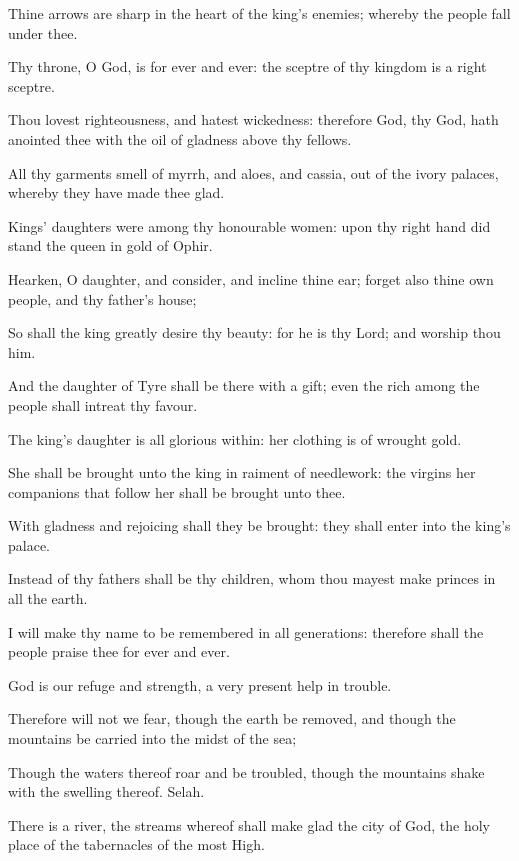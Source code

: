 \Verse Thine arrows are sharp in the heart of the king's enemies; whereby the people fall under thee.

\Verse Thy throne, O God, is for ever and ever: the sceptre of thy kingdom is a right sceptre.

\Verse Thou lovest righteousness, and hatest wickedness: therefore God, thy God, hath anointed thee with the oil of gladness above thy fellows.

\Verse All thy garments smell of myrrh, and aloes, and cassia, out of the ivory palaces, whereby they have made thee glad.

\Verse Kings' daughters were among thy honourable women: upon thy right hand did stand the queen in gold of Ophir.

\Verse Hearken, O daughter, and consider, and incline thine ear; forget also thine own people, and thy father's house;

\Verse So shall the king greatly desire thy beauty: for he is thy Lord; and worship thou him.

\Verse And the daughter of Tyre shall be there with a gift; even the rich among the people shall intreat thy favour.

\Verse The king's daughter is all glorious within: her clothing is of wrought gold.

\Verse She shall be brought unto the king in raiment of needlework: the virgins her companions that follow her shall be brought unto thee.

\Verse With gladness and rejoicing shall they be brought: they shall enter into the king's palace.

\Verse Instead of thy fathers shall be thy children, whom thou mayest make princes in all the earth.

\Verse I will make thy name to be remembered in all generations: therefore shall the people praise thee for ever and ever.




\Chapter
\Verse God is our refuge and strength, a very present help in trouble.

\Verse Therefore will not we fear, though the earth be removed, and though the mountains be carried into the midst of the sea;

\Verse Though the waters thereof roar and be troubled, though the mountains shake with the swelling thereof. Selah.

\Verse There is a river, the streams whereof shall make glad the city of God, the holy place of the tabernacles of the most High.

